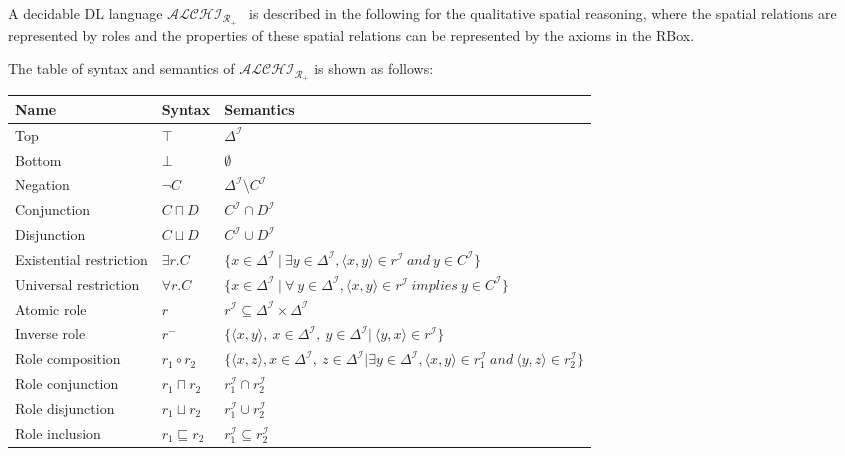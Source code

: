\documentclass{article}
\begin{document}
A decidable DL language $\mathcal{ALCHI_{R_+}}$~\cite{horrocks1999description} is described in the following for the qualitative spatial reasoning, where the spatial relations are 
represented by roles and the properties of these spatial relations can be represented by the axioms in the RBox.

The table of syntax and semantics of $\mathcal{ALCHI_{R_+}}$ is shown as follows:
 \begin{center}
 \begin{table}[H]
    \begin{tabular}{|p{4cm} | p{2cm} | p{10cm}| }
    \hline
      Name & Syntax & Semantics \\ \hline
    Top & $\top$ & $\Delta^\mathcal{I}$ \\
    Bottom & $\bot$ & $\emptyset$ \\ 
    Negation & $\neg C$ & $\Delta^\mathcal{I}\setminus C^\mathcal{I}$ \\ 
    Conjunction & $C\sqcap D$ & $C^\mathcal{I}\cap D^\mathcal{I}$  \\  
    Disjunction & $C\sqcup D$ &  $C^\mathcal{I}\cup D^\mathcal{I}$ \\  
    Existential restriction & $\exists r.C$ & $\{x\in \Delta^\mathcal{I}~|~ \exists y\in \Delta^\mathcal{I}, \langle x,y\rangle \in r^\mathcal{I}~and~y\in C^\mathcal{I}\}$ \\ 
    Universal restriction & $\forall r.C$ & $\{x\in \Delta^\mathcal{I}~|~ \forall~y\in \Delta^\mathcal{I}, \langle x,y\rangle \in r^\mathcal{I}~implies~y\in C^\mathcal{I}\}$ \\ \hline
    Atomic role & $r$ & $r^\mathcal{I}\subseteq \Delta^\mathcal{I} \times \Delta^\mathcal{I}$\\
    Inverse role & $r^-$ & $\{\langle x,y \rangle,~x\in \Delta^\mathcal{I},~y\in \Delta^\mathcal{I} | ~\langle y,x \rangle\in r^\mathcal{I}\}$\\ 
    Role composition & $r_1\circ r_2$ & $\{\langle x,z\rangle, x\in \Delta^\mathcal{I},~z\in \Delta^\mathcal{I}| \exists y\in \Delta^\mathcal{I},\langle x,y \rangle\in r_1^\mathcal{I}~and~\langle y,z\rangle\in r_2^\mathcal{I}\}$\\
    Role conjunction & $r_1\sqcap r_2$ & $r_1^\mathcal{I} \cap r_2^\mathcal{I}$ \\
    Role disjunction & $r_1\sqcup r_2$ & $r_1^\mathcal{I} \cup r_2^\mathcal{I}$ \\
    Role inclusion & $r_1\sqsubseteq r_2$ &  $r_1^\mathcal{I} \subseteq r_2^\mathcal{I}$\\

\end{tabular}
\end{table}
\end{center}
\end{document}
